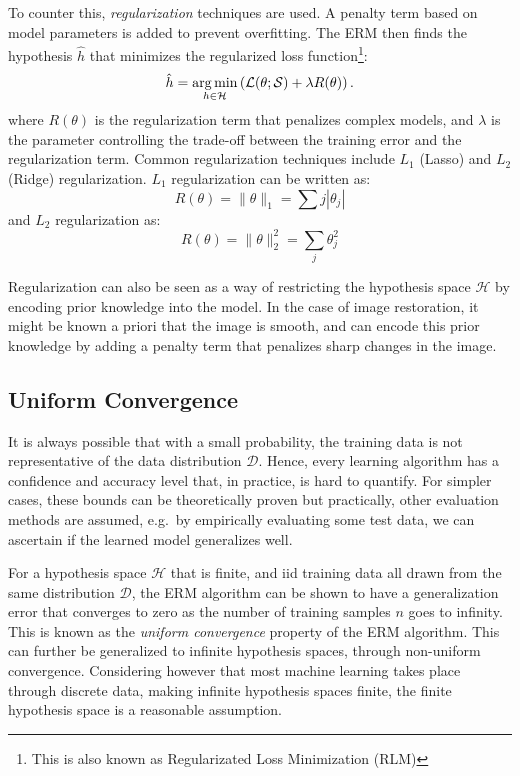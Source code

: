 To counter this, \textit{regularization} techniques are used. A penalty term based on model parameters is added to prevent overfitting. The \gls{ERM} then finds the hypothesis $\hat{h}$ that minimizes the regularized loss function\footnote{This is also known as Regularizated Loss Minimization (RLM)}:
\begin{equation}
    \hat{h} = \operatorname*{arg\,min}_{h \in \mathcal{H}} \left(\mathcal{L}(\theta; \mathcal{S})  + \lambda R(\theta) \right).
\end{equation}
where $R(\theta)$ is the regularization term that penalizes complex models, and $\lambda$ is the parameter controlling the trade-off between the training error and the regularization term. Common regularization techniques include $L_1$ (Lasso) and $L_2$ (Ridge) regularization. $L_1$ regularization can be written as:
\begin{equation*}
    R(\theta) = \|\theta\|_1 = \sum{j} |\theta_j|
\end{equation*}
and $L_2$ regularization as:
\begin{equation*}
    R(\theta) = \|\theta\|^2_2 = \sum_{j} \theta_j^2
\end{equation*}

Regularization can also be seen as a way of restricting the hypothesis space $\mathcal{H}$ by encoding prior knowledge into the model. In the case of image restoration, it might be known a priori that the image is smooth, and  can encode this prior knowledge by adding a penalty term that penalizes sharp changes in the image.


\subsection{Uniform Convergence}
It is always possible that with a small probability, the training data is not representative of the data distribution $\mathcal{D}$. Hence, every learning algorithm has a confidence and accuracy level that, in practice, is hard to quantify. For simpler cases, these bounds can be theoretically proven but practically, other evaluation methods are assumed, e.g.\ by empirically evaluating some test data, we can ascertain if the learned model generalizes well.

For a hypothesis space $\mathcal{H}$ that is finite, and \gls{iid} training data all drawn from the same distribution $\mathcal{D}$, the \gls{ERM} algorithm can be shown to have a generalization error that converges to zero as the number of training samples $n$ goes to infinity. This is known as the \textit{uniform convergence} property of the \gls{ERM} algorithm. This can further be generalized to infinite hypothesis spaces, through non-uniform convergence. Considering however that most machine learning takes place through discrete data, making infinite hypothesis spaces finite, the finite hypothesis space is a reasonable assumption.

